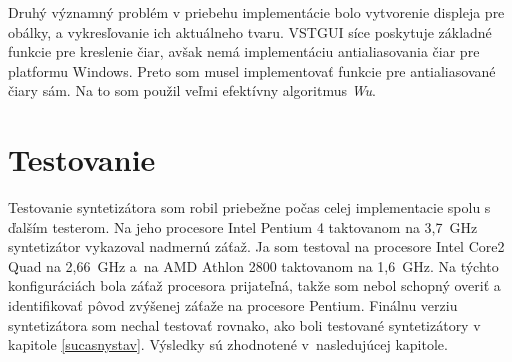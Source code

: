 Druhý významný problém v priebehu implementácie bolo vytvorenie displeja pre obálky, a vykresľovanie ich aktuálneho tvaru. VSTGUI síce poskytuje základné funkcie pre kreslenie čiar, avšak nemá implementáciu antialiasovania čiar pre platformu Windows. Preto som musel implementovať funkcie pre antialiasované čiary sám. Na to som použil veľmi efektívny algoritmus \emph{Wu}.

\section{Testovanie}

Testovanie syntetizátora som robil priebežne počas celej implementacie spolu s ďalším testerom. Na jeho procesore Intel Pentium 4 taktovanom na 3,7~GHz syntetizátor vykazoval nadmernú záťaž. Ja som testoval na procesore Intel Core2 Quad na 2,66~GHz a~na AMD Athlon 2800 taktovanom na 1,6~GHz. Na týchto konfiguráciách bola záťaž procesora prijateľná, takže som nebol schopný overiť a identifikovať pôvod zvýšenej záťaže na procesore Pentium. 
 Finálnu verziu syntetizátora som nechal testovať rovnako, ako boli testované syntetizátory v kapitole \ref{sucasnystav}. Výsledky sú zhodnotené v~nasledujúcej kapitole.

